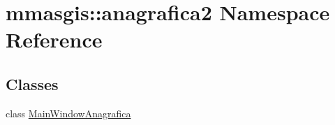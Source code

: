 \hypertarget{namespacemmasgis_1_1anagrafica2}{
\section{mmasgis::anagrafica2 Namespace Reference}
\label{namespacemmasgis_1_1anagrafica2}
}
\subsection*{Classes}
\begin{DoxyCompactItemize}
\item 
class \hyperlink{classmmasgis_1_1anagrafica2_1_1MainWindowAnagrafica}{MainWindowAnagrafica}
\end{DoxyCompactItemize}
